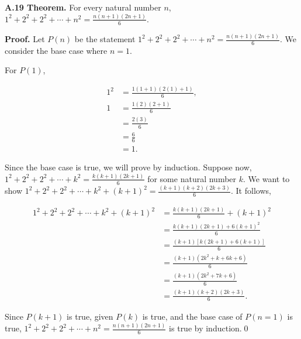 \documentclass[12pt]{article}
\begin{document}
\noindent\textbf{A.19 Theorem.} For every natural number $n$, $1^2+2^2+2^2+\cdots +n^2= \frac{n(n+1)(2n+1)}{6}$.

\bigskip

\noindent\textbf{Proof.} Let $P(n)$ be the statement $1^2+2^2+2^2+\cdots +n^2= \frac{n(n+1)(2n+1)}{6}$. We consider the base case where $n=1$. 

\bigskip

\noindent For $P(1)$,

 
\begin{align*}
1^2 &= \frac{1(1+1)(2(1)+1)}{6}, \\
1 &= \frac{1(2)(2+1)}{6} \\
&= \frac{2(3)}{6} \\
&= \frac{6}{6} \\
&= 1.
\end{align*}


\noindent Since the base case is true, we will prove by induction. Suppose now, $1^2+2^2+2^2+\cdots +k^2= \frac{k(k+1)(2k+1)}{6}$ for some natural number $k$. We want to show $1^2+2^2+2^2+\cdots +k^2+(k+1)^2= \frac{(k+1)(k+2)(2k+3)}{6}$. It follows,


\begin{align*}
1^2+2^2+2^2+\cdots +k^2+(k+1)^2 &= \frac{k(k+1)(2k+1)}{6} +(k+1)^2 \\
&= \frac{k(k+1)(2k+1)+6(k+1)^2}{6} \\
&= \frac{(k+1)[k(2k+1)+6(k+1)]}{6} \\
&= \frac{(k+1)(2k^2+k+6k+6)}{6} \\
&= \frac{(k+1)(2k^2+7k+6)}{6} \\
&= \frac{(k+1)(k+2)(2k+3)}{6}.
\end{align*}


\noindent Since $P(k+1)$ is true, given $P(k)$ is true, and the base case of $P(n=1)$ is true, $1^2+2^2+2^2+\cdots +n^2= \frac{n(n+1)(2n+1)}{6}$ is true by induction.\qed
\end{document}

